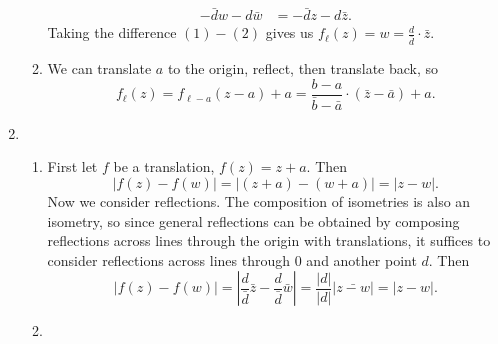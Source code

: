 \begin{enumerate}
\begin{enumerate}
\begin{align*}
-\bar{d}w - d\bar{w} &= -\bar{d}z - d\bar{z}. \tag{2}
\end{align*}
Taking the difference $(1) - (2)$ gives us $f_{\ell}(z) = w = \frac{d}{\bar{d}}\cdot\bar{z}$.
\item We can translate $a$ to the origin, reflect, then translate back, so 
\begin{equation*}
f_{\ell}(z) = f_{\ell - a}(z - a) + a = \frac{b - a}{\bar{b} - \bar{a}}\cdot(\bar{z} - \bar{a}) + a.
\end{equation*}
\end{enumerate}
\item \begin{enumerate}
\item First let $f$ be a translation, $f(z) = z + a$. Then
\begin{equation*}
\lvert f(z) - f(w)\rvert = \lvert (z + a) - (w + a)\rvert = \lvert z - w\rvert.
\end{equation*}
Now we consider reflections. The composition of isometries is also an isometry, so since general reflections can be obtained by composing reflections across lines through the origin with translations, it suffices to consider reflections across lines through $0$ and another point $d$. Then
\begin{equation*}
\lvert f(z) - f(w)\rvert = \left\lvert\frac{d}{\bar{d}}\bar{z} - \frac{d}{\bar{d}}\bar{w}\right\rvert = \frac{\lvert d\rvert}{\lvert d\rvert}\lvert\bar{z - w}\rvert = \lvert z - w\rvert.
\end{equation*}
\item 
\end{enumerate}
\end{enumerate}